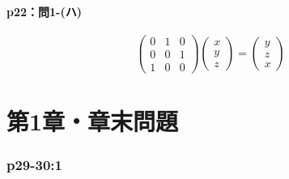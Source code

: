 \documentclass[a4paper,10pt,fleqn]{ltjsarticle}
\begin{document}
\subsection*{p22：問1-(ハ)}

\begin{tleftbar}
    \[
        \begin{pmatrix}
            0 & 1 & 0 \\
            0 & 0 & 1 \\
            1 & 0 & 0
        \end{pmatrix}
        \begin{pmatrix}
            x \\
            y \\
            z
        \end{pmatrix}
        =\begin{pmatrix}
            y \\
            z \\
            x
        \end{pmatrix}
    \]
\end{tleftbar}


\setcounter{equation}{0}

\part*{第1章・章末問題}


\section*{p29-30:1}
\end{document}
